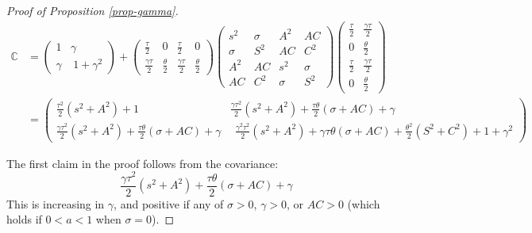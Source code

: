 \documentclass[
]{article}
\theoremstyle{definition}
\theoremstyle{definition}
\theoremstyle{definition}
\theoremstyle{definition}
\theoremstyle{remark}
\begin{document}
\begin{proof}[Proof of Proposition \ref{prop-gamma}]
\begin{align*}
\mathbb{C}  &= \left(\begin{array}{cc}
1 & \gamma\\
\gamma & \ 1+\gamma^{2}
\end{array}\right)+\left(\begin{array}{cccc}
\frac{\tau}{2} & 0 & \frac{\tau}{2} & 0\\
\frac{\gamma\tau}{2} & \frac{\theta}{2} & \frac{\gamma\tau}{2} & \frac{\theta}{2}
\end{array}\right)\left(\begin{array}{cccc}
s^{2} & \sigma & A^{2} & AC\\
\sigma & S^{2} & AC & C^{2}\\
A^{2} & AC & s^{2} & \sigma\\
AC & C^{2} & \sigma & S^{2}
\end{array}\right)\left(\begin{array}{cc}
\frac{\tau}{2} & \frac{\gamma\tau}{2}\\
0 & \frac{\theta}{2}\\
\frac{\tau}{2} & \frac{\gamma\tau}{2}\\
0 & \frac{\theta}{2}
\end{array}\right) \\
    &=\left(\begin{array}{cc}
\frac{\tau^{2}}{2}(s^{2}+A^{2})+1 & \frac{\gamma\tau^{2}}{2}(s^{2}+A^{2})+\frac{\tau\theta}{2}(\sigma+AC)+\gamma\\
\frac{\gamma\tau^{2}}{2}(s^{2}+A^{2})+\frac{\tau\theta}{2}(\sigma+AC)+\gamma & \ \ \frac{\gamma^{2}\tau^{2}}{2}(s^{2}+A^{2})+\gamma\tau\theta(\sigma+AC)+\frac{\theta^{2}}{2}(S^{2}+C^{2})+1+\gamma^{2}
\end{array}\right)
\end{align*}

The first claim in the proof follows from the covariance:
\[
\frac{\gamma\tau^{2}}{2}(s^{2}+A^{2})+\frac{\tau\theta}{2}(\sigma+AC)+\gamma
\]
This is increasing in $\gamma$, and positive if any of $\sigma > 0$, 
$\gamma > 0$,  or $AC > 0$ (which holds if $0 < a < 1$ when $\sigma = 0$).


\end{proof}
\end{document}
